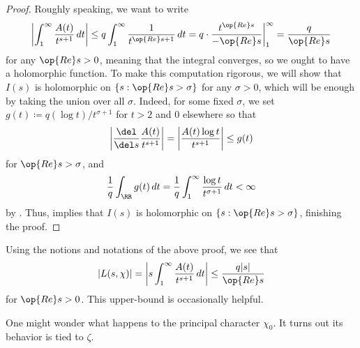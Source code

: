 \documentclass[../notes.tex]{subfiles}
\begin{document}
\begin{proof}
	Roughly speaking, we want to write
	\[\left|\int_1^\infty\frac{A(t)}{t^{s+1}}\,dt\right|\le q\int_1^\infty\frac1{t^{\op{Re}s+1}}\,dt=q\cdot\frac{t^{\op{Re}s}}{-\op{Re}s}\bigg|_1^\infty=\frac q{\op{Re}s}\]
	for any $\op{Re}s>0$, meaning that the integral converges, so we ought to have a holomorphic function. To make this computation rigorous, we will show that $I(s)$ is holomorphic on $\{s:\op{Re}s>\sigma\}$ for any $\sigma>0$, which will be enough by taking the union over all $\sigma$. Indeed, for some fixed $\sigma$, we set $g(t)\coloneqq q(\log t)/t^{\sigma+1}$ for $t>2$ and $0$ elsewhere so that
	\[\left|\frac{\del}{\del s}\frac{A(t)}{t^{s+1}}\right|=\left|\frac{A(t)\log t}{t^{s+1}}\right|\le g(t)\]
	for $\op{Re}s>\sigma$, and
	\[\frac1q\int_\RR g(t)\,dt=\frac1q\int_1^\infty\frac{\log t}{t^{\sigma+1}}\,dt<\infty\]
	by . Thus,  implies that $I(s)$ is holomorphic on $\{s:\op{Re}s>\sigma\}$, finishing the proof.
\end{proof}
\begin{remark} \label{rem:bound-l-chi}
	Using the notions and notations of the above proof, we see that
	\[|L(s,\chi)|=\left|s\int_1^\infty\frac{A(t)}{t^{s+1}}\,dt\right|\le\frac{q|s|}{\op{Re}s}\]
	for $\op{Re}s>0$. This upper-bound is occasionally helpful.
\end{remark}
One might wonder what happens to the principal character $\chi_0$. It turns out its behavior is tied to $\zeta$.
\end{document}
